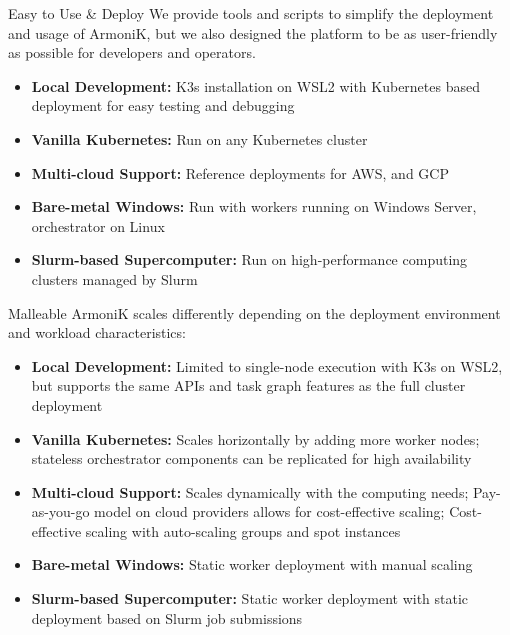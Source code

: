 \begin{frame}{Easy to Use \& Deploy}
	We provide tools and scripts to simplify the deployment and usage of ArmoniK, but we also designed the platform to be as user-friendly as possible for developers and operators.
	\begin{itemize}
		\item \textbf{Local Development:} K3s installation on WSL2 with Kubernetes based deployment for easy testing and debugging
		\item \textbf{Vanilla Kubernetes:} Run on any Kubernetes cluster
		\item \textbf{Multi-cloud Support:} Reference deployments for AWS, and GCP
		\item \textbf{Bare-metal Windows:} Run with workers running on Windows Server, orchestrator on Linux
		\item \textbf{Slurm-based Supercomputer:} Run on high-performance computing clusters managed by Slurm
	\end{itemize}
\end{frame}

\begin{frame}{Malleable}
	ArmoniK scales differently depending on the deployment environment and workload characteristics:
	\begin{itemize}
		\item \textbf{Local Development:} Limited to single-node execution with K3s on WSL2, but supports the same APIs and task graph features as the full cluster deployment
		\item \textbf{Vanilla Kubernetes:} Scales horizontally by adding more worker nodes; stateless orchestrator components can be replicated for high availability
		\item \textbf{Multi-cloud Support:} Scales dynamically with the computing needs; Pay-as-you-go model on cloud providers allows for cost-effective scaling; Cost-effective scaling with auto-scaling groups and spot instances
		\item \textbf{Bare-metal Windows:} Static worker deployment with manual scaling
		\item \textbf{Slurm-based Supercomputer:} Static worker deployment with static deployment based on Slurm job submissions
	\end{itemize}
\end{frame}

